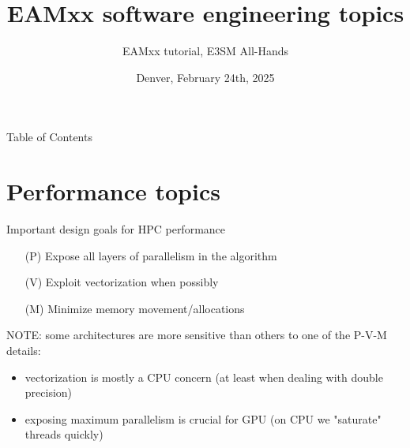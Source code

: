 \documentclass[8pt,NM,theme=angles,number=SAND2025-01977PE]{sandia-beamer}
\title{EAMxx software engineering topics}
\author{\centering{L.Bertagna}}
\subtitle{EAMxx tutorial, E3SM All-Hands}
\date{Denver, February 24th, 2025}
\begin{document}
\begin{frame}
  \maketitle
\end{frame}

\begin{frame}{Table of Contents}
    \tableofcontents
\end{frame}

\section{Performance topics}
\begin{frame}{Important design goals for HPC performance}
  \begin{itemize}
    \item [(P)] Expose all layers of parallelism in the algorithm
    \item [(V)] Exploit vectorization when possibly
    \item [(M)] Minimize memory movement/allocations
  \end{itemize}

  \vspace{1cm}
  NOTE: some architectures are more sensitive than others to one of the P-V-M details:
  \begin{itemize}
    \item vectorization is mostly a CPU concern (at least when dealing with double precision)
    \item exposing maximum parallelism is crucial for GPU (on CPU we "saturate" threads quickly)
  \end{itemize}

\end{frame}
\end{document}
